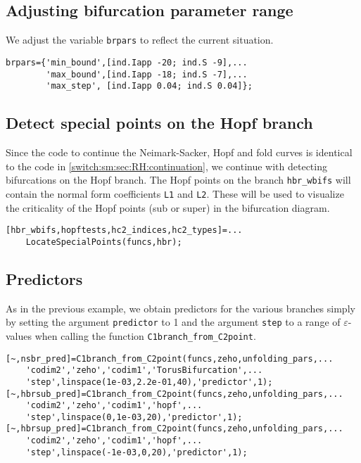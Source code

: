 \subsection{Adjusting bifurcation parameter range}
We adjust the variable \lstinline|brpars| to reflect the current situation.
\begin{lstlisting}[style=customMatlab]
%% Set bifurcation parameter range and step size bounds
brpars={'min_bound',[ind.Iapp -20; ind.S -9],...
        'max_bound',[ind.Iapp -18; ind.S -7],...
        'max_step', [ind.Iapp 0.04; ind.S 0.04]};
\end{lstlisting}

\subsection{Detect special points on the Hopf branch}
Since the code to continue the Neimark-Sacker, Hopf and fold curves is identical to the code in \cref{switch:sm:sec:RH:continuation}, we continue with detecting bifurcations on the Hopf branch. The Hopf points on the branch \lstinline|hbr_wbifs| will contain the normal form coefficients \lstinline|L1| and \lstinline|L2|. These will be used to visualize the criticality of the Hopf points (sub or super) in the bifurcation diagram.
\begin{lstlisting}[style=customMatlab]
[hbr_wbifs,hopftests,hc2_indices,hc2_types]=...
    LocateSpecialPoints(funcs,hbr);
\end{lstlisting}

\subsection{Predictors}
As in the previous example, we obtain predictors for the various branches simply by setting the argument \lstinline|predictor| to 1 and the argument \lstinline|step| to a range of $\varepsilon$-values when calling the function \lstinline|C1branch_from_C2point|.
\begin{lstlisting}[style=customMatlab]
%% Predictors for Neimark-Sacker and Hopf curves
[~,nsbr_pred]=C1branch_from_C2point(funcs,zeho,unfolding_pars,...
    'codim2','zeho','codim1','TorusBifurcation',...
    'step',linspace(1e-03,2.2e-01,40),'predictor',1);
[~,hbrsub_pred]=C1branch_from_C2point(funcs,zeho,unfolding_pars,...
    'codim2','zeho','codim1','hopf',...
    'step',linspace(0,1e-03,20),'predictor',1);
[~,hbrsup_pred]=C1branch_from_C2point(funcs,zeho,unfolding_pars,...
    'codim2','zeho','codim1','hopf',...
    'step',linspace(-1e-03,0,20),'predictor',1);
\end{lstlisting}


